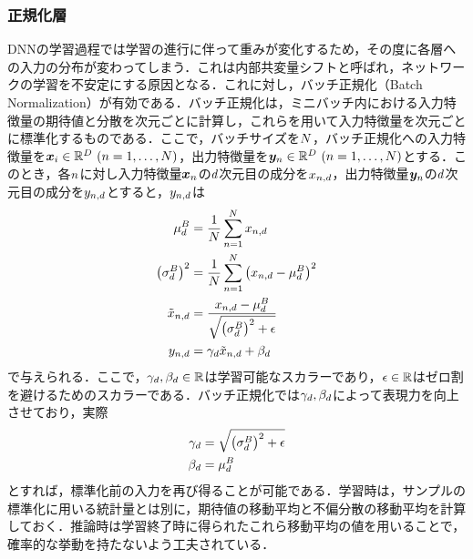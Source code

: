 \documentclass[12pt]{jarticle}
\numberwithin{equation}{section}    %
\numberwithin{figure}{section}      %
\numberwithin{table}{section}      %
\begin{document}
\subsubsection{正規化層}
DNNの学習過程では学習の進行に伴って重みが変化するため，その度に各層への入力の分布が変わってしまう．これは内部共変量シフトと呼ばれ，ネットワークの学習を不安定にする原因となる．これに対し，バッチ正規化（Batch Normalization）\cite{ioffe2015batch}が有効である．バッチ正規化は，ミニバッチ内における入力特徴量の期待値と分散を次元ごとに計算し，これらを用いて入力特徴量を次元ごとに標準化するものである．ここで，バッチサイズを$N$，バッチ正規化への入力特徴量を$\bm{x}_{i} \in \mathbb{R}^{D} ~ (n = 1, \ldots, N)$，出力特徴量を$\bm{y}_{n} \in \mathbb{R}^{D} ~ (n = 1, \ldots, N)$とする．このとき，各$n$に対し入力特徴量$\bm{x}_{n}$の$d$次元目の成分を$x_{n, d}$，出力特徴量$\bm{y}_{n}$の$d$次元目の成分を$y_{n, d}$とすると，$y_{n, d}$は
\begin{align}
    \mu^{B}_{d}                        & = \frac{1}{N} \sum_{n = 1}^{N} x_{n, d}                                        \\
    \left(\sigma^{B}_{d}\right)^{2}    & = \frac{1}{N} \sum_{n = 1}^{N} \left(x_{n, d} - \mu^{B}_{d}\right)^{2} \\
    \tilde{x}_{n, d} & = \frac{x_{n, d} - \mu^{B}_{d}}{\sqrt{\left(\sigma^{B}_{d}\right)^{2} + \epsilon}}     \\
    y_{n, d}        & = \gamma_{d} \tilde{x}_{n, d} +  \beta_{d}
\end{align}
で与えられる．ここで，$\gamma_{d}, \beta_{d} \in \mathbb{R}$は学習可能なスカラーであり，$\epsilon \in \mathbb{R}$はゼロ割を避けるためのスカラーである．バッチ正規化では$\gamma_{d}, \beta_{d}$によって表現力を向上させており，実際
\begin{align}
    \gamma_{d} & = \sqrt{\left(\sigma^{B}_{d}\right)^{2} + \epsilon} \\
    \beta_{d}  & = \mu^{B}_{d}
\end{align}
とすれば，標準化前の入力を再び得ることが可能である．学習時は，サンプルの標準化に用いる統計量とは別に，期待値の移動平均と不偏分散の移動平均を計算しておく．推論時は学習終了時に得られたこれら移動平均の値を用いることで，確率的な挙動を持たないよう工夫されている．
\end{document}
